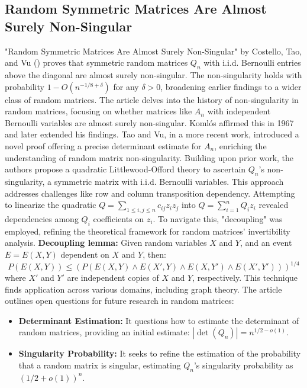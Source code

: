 
\subsection{Random Symmetric Matrices Are Almost Surely Non-Singular}



"Random Symmetric Matrices Are Almost Surely Non-Singular" by Costello, Tao, and Vu (\cite{costello2005random}) proves that symmetric random matrices \(Q_n\) with i.i.d. Bernoulli entries above the diagonal are almost surely non-singular. The non-singularity holds with probability \(1-O(n^{-1/8+\delta})\) for any \(\delta>0\), broadening earlier findings to a wider class of random matrices.
The article delves into the history of non-singularity in random matrices, focusing on whether matrices like \(A_n\) with independent Bernoulli variables are almost surely non-singular. Komlós affirmed this in 1967 and later extended his findings. Tao and Vu, in a more recent work, introduced a novel proof offering a precise determinant estimate for \(A_n\), enriching the understanding of random matrix non-singularity.
Building upon prior work, the authors propose a quadratic Littlewood-Offord theory to ascertain \(Q_n\)'s non-singularity, a symmetric matrix with i.i.d. Bernoulli variables. This approach addresses challenges like row and column transposition dependency. Attempting to linearize the quadratic \( Q=\sum_{1\leq i,j\leq n} c_{ij} z_i z_j \) into \( Q=\sum_{i=1}^n Q_i z_i \) revealed dependencies among \( Q_i \) coefficients on \( z_i \). To navigate this, "decoupling" was employed, refining the theoretical framework for random matrices' invertibility analysis.
\textbf{Decoupling lemma:} Given random variables \(X\) and \(Y\), and an event \(E=E(X,Y)\) dependent on \(X\) and \(Y\), then:
\[
P(E(X,Y)) \leq (P(E(X,Y) \land E(X',Y) \land E(X,Y') \land E(X',Y')))^{1/4}
\]
where \(X'\) and \(Y'\) are independent copies of \(X\) and \(Y\), respectively. This technique finds application across various domains, including graph theory.
The article outlines open questions for future research in random matrices:
\begin{itemize}
    \item \textbf{Determinant Estimation:} It questions how to estimate the determinant of random matrices, providing an initial estimate: \( |\det(Q_n)| = n^{1/2-o(1)} \).
    \item \textbf{Singularity Probability:} It seeks to refine the estimation of the probability that a random matrix is singular, estimating \( Q_n \)'s singularity probability as \( (1/2+o(1))^n \).
\end{itemize}
